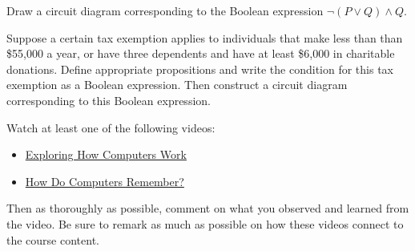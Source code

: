 \documentclass[11pt,letterpaper]{article}
\begin{document}
\sol 



\newpage



 Draw a circuit diagram corresponding to the Boolean expression $\neg (P \vee Q) \wedge Q$. \pspace

\sol 



\newpage



 Suppose a certain tax exemption applies to individuals that make less than than \$55,000 a year, or have three dependents and have at least \$6,000 in charitable donations. Define appropriate propositions and write the condition for this tax exemption as a Boolean expression. Then construct a circuit diagram corresponding to this Boolean expression. \pspace

\sol 



\newpage



 Watch at least one of the following videos:
	\begin{itemize}
	\item \href{https://www.youtube.com/watch?v=QZwneRb-zqA&ab_channel=SebastianLague}{Exploring How Computers Work}
	\item \href{https://www.youtube.com/watch?v=I0-izyq6q5s&ab_channel=SebastianLague}{How Do Computers Remember?}
	\end{itemize}
Then as thoroughly as possible, comment on what you observed and learned from the video. Be sure to remark as much as possible on how these videos connect to the course content. \pspace

\sol 
\end{document}

